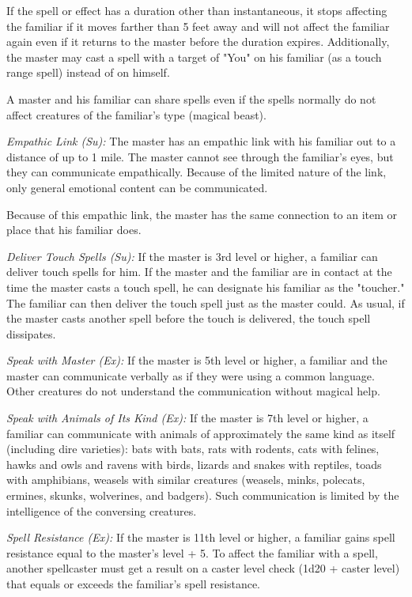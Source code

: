 If the spell or effect has a duration other than instantaneous, it stops affecting the familiar if it moves farther than 5 feet away and will not affect the familiar again even if it returns to the master before the duration expires. Additionally, the master may cast a spell with a target of "You" on his familiar (as a touch range spell) instead of on himself.

A master and his familiar can share spells even if the spells normally do not affect creatures of the familiar's type (magical beast).

\textit{Empathic Link (Su):} The master has an empathic link with his familiar out to a distance of up to 1 mile. The master cannot see through the familiar's eyes, but they can communicate empathically. Because of the limited nature of the link, only general emotional content can be communicated.

Because of this empathic link, the master has the same connection to an item or place that his familiar does.

\textit{Deliver Touch Spells (Su):} If the master is 3rd level or higher, a familiar can deliver touch spells for him. If the master and the familiar are in contact at the time the master casts a touch spell, he can designate his familiar as the "toucher." The familiar can then deliver the touch spell just as the master could. As usual, if the master casts another spell before the touch is delivered, the touch spell dissipates.

\textit{Speak with Master (Ex):} If the master is 5th level or higher, a familiar and the master can communicate verbally as if they were using a common language. Other creatures do not understand the communication without magical help.

\textit{Speak with Animals of Its Kind (Ex):} If the master is 7th level or higher, a familiar can communicate with animals of approximately the same kind as itself (including dire varieties): bats with bats, rats with rodents, cats with felines, hawks and owls and ravens with birds, lizards and snakes with reptiles, toads with amphibians, weasels with similar creatures (weasels, minks, polecats, ermines, skunks, wolverines, and badgers). Such communication is limited by the intelligence of the conversing creatures.

\textit{Spell Resistance (Ex):} If the master is 11th level or higher, a familiar gains spell resistance equal to the master's level + 5. To affect the familiar with a spell, another spellcaster must get a result on a caster level check (1d20 + caster level) that equals or exceeds the familiar's spell resistance.

